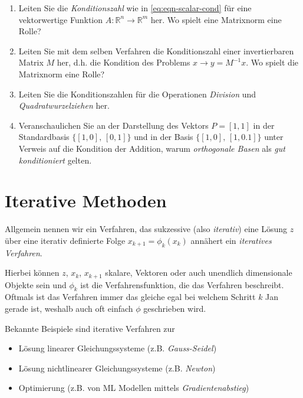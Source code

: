\documentclass[
]{book}
\providecommand{\tightlist}{%
  \setlength{\itemsep}{0pt}\setlength{\parskip}{0pt}}
\theoremstyle{definition}
\theoremstyle{definition}
\theoremstyle{definition}
\theoremstyle{definition}
\theoremstyle{remark}
\begin{document}
\begin{enumerate}
\def\labelenumi{\arabic{enumi}.}
\tightlist
\item
  Leiten Sie die \emph{Konditionszahl} wie in \eqref{eq:eqn-scalar-cond} für eine vektorwertige Funktion \(A\colon \mathbb R^{n} \to \mathbb R^{m}\) her. Wo spielt eine Matrixnorm eine Rolle?
\item
  Leiten Sie mit dem selben Verfahren die Konditionszahl einer invertierbaren Matrix \(M\) her, d.h. die Kondition des Problems \(x\to y = M^{-1}x\). Wo spielt die Matrixnorm eine Rolle?
\item
  Leiten Sie die Konditionszahlen für die Operationen \emph{Division} und \emph{Quadratwurzelziehen} her.
\item
  Veranschaulichen Sie an der Darstellung des Vektors \(P=[1, 1]\) in der Standardbasis \(\{[1, 0], \,[0, 1]\}\) und in der Basis \(\{[1, 0], \,[1, 0.1]\}\) unter Verweis auf die Kondition der Addition, warum \emph{orthogonale Basen} als \emph{gut konditioniert} gelten.
\end{enumerate}

\hypertarget{iterative-methoden}{%
\chapter{Iterative Methoden}\label{iterative-methoden}}

Allgemein nennen wir ein Verfahren, das sukzessive (also \emph{iterativ}) eine Lösung \(z\) über eine iterativ definierte Folge \(x_{k+1}=\phi_k(x_k)\) annähert ein \emph{iteratives Verfahren}.

Hierbei können \(z\), \(x_k\), \(x_{k+1}\) skalare, Vektoren oder auch unendlich dimensionale Objekte sein und \(\phi_k\) ist die Verfahrensfunktion, die das Verfahren beschreibt.
Oftmals ist das Verfahren immer das gleiche egal bei welchem Schritt \(k\) Jan gerade ist, weshalb auch oft einfach \(\phi\) geschrieben wird.

Bekannte Beispiele sind iterative Verfahren zur

\begin{itemize}
\tightlist
\item
  Lösung linearer Gleichungssysteme (z.B. \emph{Gauss-Seidel})
\item
  Lösung nichtlinearer Gleichungssysteme (z.B. \emph{Newton})
\item
  Optimierung (z.B. von ML Modellen mittels \emph{Gradientenabstieg})
\end{itemize}
\end{document}
